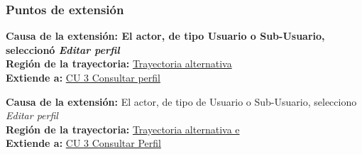 \subsubsection{Puntos de extensión}
\noindent \textbf{Causa de la extensión: El actor, de tipo Usuario o Sub-Usuario, seleccionó \textit{Editar perfil}} \\
\textbf{Región de la trayectoria:} \hyperref[cu3_ta_]{Trayectoria alternativa } \\
\textbf{Extiende a:} \hyperref[cu3]{CU 3 Consultar perfil}

\noindent \textbf{Causa de la extensión:} El actor, de tipo de Usuario o Sub-Usuario, selecciono \textit{Editar perfil} \\
\textbf{Región de la trayectoria:} \hyperref[cu3_3_ta_e]{Trayectoria alternativa e} \\
\textbf{Extiende a:} \hyperref[cu3]{CU 3 Consultar Perfil}
